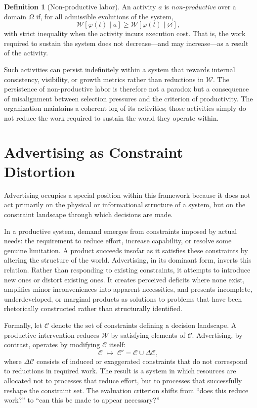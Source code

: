 \documentclass[12pt, oneside]{article}
\theoremstyle{definition}
\newtheorem{definition}{Definition}[section]
\newcommand{\field}{\varphi}
\newcommand{\Wfunc}{\mathcal{W}}
\begin{document}
\begin{definition}[Non-productive labor]
An activity $a$ is \emph{non-productive} over a domain $\Omega$ if, for all admissible evolutions of the system,
\[
  \Wfunc[\field(t) \mid a] \geq \Wfunc[\field(t) \mid \varnothing],
\]
with strict inequality when the activity incurs execution cost. That is, the work required to sustain the system does not decrease---and may increase---as a result of the activity.
\end{definition}

Such activities can persist indefinitely within a system that rewards internal consistency, visibility, or growth metrics rather than reductions in $\Wfunc$. The persistence of non-productive labor is therefore not a paradox but a consequence of misalignment between selection pressures and the criterion of productivity. The organization maintains a coherent log of its activities; those activities simply do not reduce the work required to sustain the world they operate within.

\section{Advertising as Constraint Distortion}

Advertising occupies a special position within this framework because it does not act primarily on the physical or informational structure of a system, but on the constraint landscape through which decisions are made.

In a productive system, demand emerges from constraints imposed by actual needs: the requirement to reduce effort, increase capability, or resolve some genuine limitation. A product succeeds insofar as it satisfies these constraints by altering the structure of the world. Advertising, in its dominant form, inverts this relation. Rather than responding to existing constraints, it attempts to introduce new ones or distort existing ones. It creates perceived deficits where none exist, amplifies minor inconveniences into apparent necessities, and presents incomplete, underdeveloped, or marginal products as solutions to problems that have been rhetorically constructed rather than structurally identified.

Formally, let $\mathcal{C}$ denote the set of constraints defining a decision landscape. A productive intervention reduces $\Wfunc$ by satisfying elements of $\mathcal{C}$. Advertising, by contrast, operates by modifying $\mathcal{C}$ itself:
\[
  \mathcal{C} \;\mapsto\; \mathcal{C}' = \mathcal{C} \cup \Delta\mathcal{C},
\]
where $\Delta\mathcal{C}$ consists of induced or exaggerated constraints that do not correspond to reductions in required work. The result is a system in which resources are allocated not to processes that reduce effort, but to processes that successfully reshape the constraint set. The evaluation criterion shifts from ``does this reduce work?'' to ``can this be made to appear necessary?''
\end{document}
